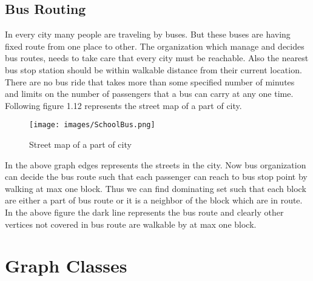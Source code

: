 \subsection{Bus Routing}
\noindent
In every city many people are traveling by buses. But these buses are having fixed route from one place to other. The organization which manage and decides bus routes, needs to take care that every city must be reachable. Also the nearest bus stop station should be within walkable distance from their current location. There are no bus ride that takes more than some specified number of minutes and limits on the number of passengers that a bus can carry at any one time. Following figure 1.12 represents the street map of a part of city. 
\begin{figure}[H]
\centering
\texttt{[image: images/SchoolBus.png]}	
    \caption{Street map of a part of city}
\end{figure}
\noindent
In the above graph edges represents the streets in the city. Now bus organization can decide the bus route such that each passenger can reach to bus stop point by walking at max one block. Thus we can find dominating set such that each block are either a part of bus route or it is a neighbor of the block which are in route. In the above figure the dark line represents the bus route and clearly other vertices not covered in bus route are walkable by at max one block.
\section{Graph Classes}
